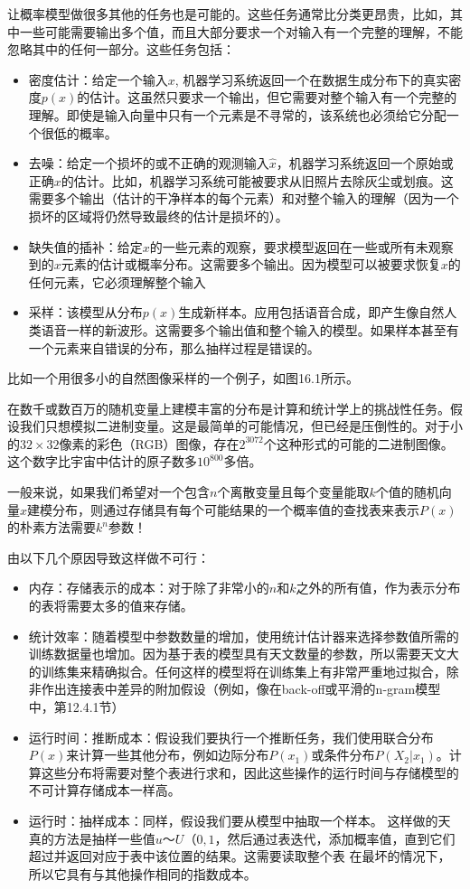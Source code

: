 让概率模型做很多其他的任务也是可能的。这些任务通常比分类更昂贵，比如，其中一些可能需要输出多个值，而且大部分要求一个对输入有一个完整的理解，不能忽略其中的任何一部分。这些任务包括：
\begin{itemize}
\item 密度估计：给定一个输入$x$, 机器学习系统返回一个在数据生成分布下的真实密度$p(x)$的估计。这虽然只要求一个输出，但它需要对整个输入有一个完整的理解。即使是输入向量中只有一个元素是不寻常的，该系统也必须给它分配一个很低的概率。
\item 去噪：给定一个损坏的或不正确的观测输入$\hat{x}$，机器学习系统返回一个原始或正确$x$的估计。比如，机器学习系统可能被要求从旧照片去除灰尘或划痕。这需要多个输出（估计的干净样本的每个元素）和对整个输入的理解（因为一个损坏的区域将仍然导致最终的估计是损坏的）。
\item 缺失值的插补：给定$x$的一些元素的观察，要求模型返回在一些或所有未观察到的$x$元素的估计或概率分布。这需要多个输出。因为模型可以被要求恢复$x$的任何元素，它必须理解整个输入
\item 采样：该模型从分布$p(x)$生成新样本。应用包括语音合成，即产生像自然人类语音一样的新波形。这需要多个输出值和整个输入的模型。如果样本甚至有一个元素来自错误的分布，那么抽样过程是错误的。
\end{itemize}

比如一个用很多小的自然图像采样的一个例子，如图16.1所示。

在数千或数百万的随机变量上建模丰富的分布是计算和统计学上的挑战性任务。假设我们只想模拟二进制变量。这是最简单的可能情况，但已经是压倒性的。对于小的$32×32$像素的彩色（RGB）图像，存在$2^3072$个这种形式的可能的二进制图像。这个数字比宇宙中估计的原子数多$10^800$多倍。

一般来说，如果我们希望对一个包含$n$个离散变量且每个变量能取$k$个值的随机向量$x$建模分布，则通过存储具有每个可能结果的一个概率值的查找表来表示$P(x)$的朴素方法需要$k^n$参数！

由以下几个原因导致这样做不可行：
\begin{itemize}
\item 内存：存储表示的成本：对于除了非常小的$n$和$k$之外的所有值，作为表示分布的表将需要太多的值来存储。
\item 统计效率：随着模型中参数数量的增加，使用统计估计器来选择参数值所需的训练数据量也增加。因为基于表的模型具有天文数量的参数，所以需要天文大的训练集来精确拟合。任何这样的模型将在训练集上有非常严重地过拟合，除非作出连接表中差异的附加假设（例如，像在back-off或平滑的n-gram模型中，第12.4.1节）
\item 运行时间：推断成本：假设我们要执行一个推断任务，我们使用联合分布$P(x)$来计算一些其他分布，例如边际分布$P(x_1)$或条件分布$P(X_2|x_1)$。计算这些分布将需要对整个表进行求和，因此这些操作的运行时间与存储模型的不可计算存储成本一样高。
\item 运行时：抽样成本：同样，假设我们要从模型中抽取一个样本。 这样做的天真的方法是抽样一些值$u〜U（0,1$，然后通过表迭代，添加概率值，直到它们超过并返回对应于表中该位置的结果。这需要读取整个表 在最坏的情况下，所以它具有与其他操作相同的指数成本。
\end{itemize}

